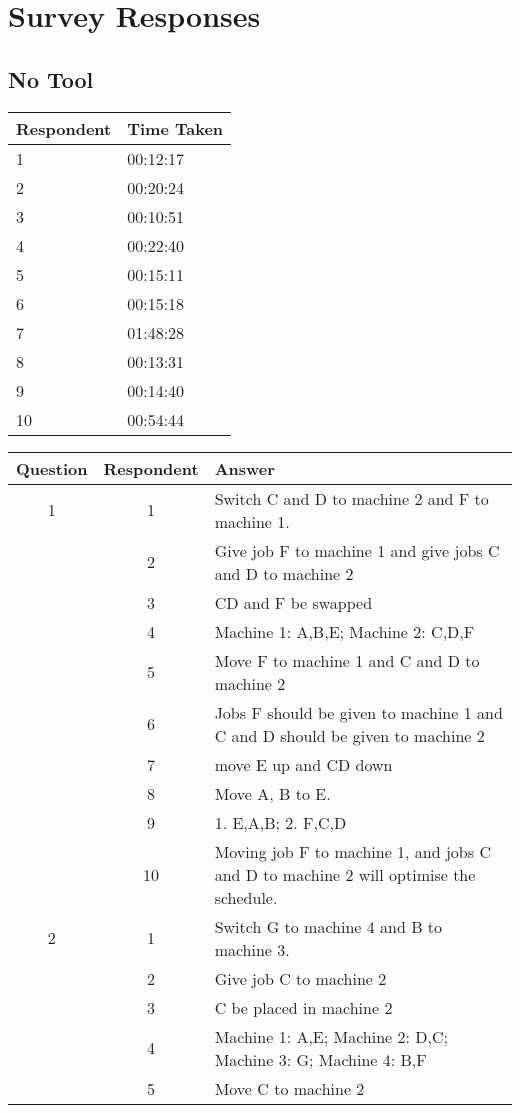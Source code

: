 \chapter{Survey Responses}

\section{No Tool}
\label{notool}

\begin{tabular}{l l}
	Respondent & Time Taken \\
	\hline
	1 & 00:12:17 \\
	2 & 00:20:24 \\
	3 & 00:10:51 \\
	4 & 00:22:40 \\
	5 & 00:15:11 \\
	6 & 00:15:18 \\
	7 & 01:48:28 \\
	8 & 00:13:31 \\
	9 & 00:14:40 \\
	10 & 00:54:44 \\
\end{tabular}
\linespace
\begin{tabularx}{\linewidth}{c c X}
	Question & Respondent & Answer \\
	\hline
	1 & 1 & Switch C and D to machine 2 and F to machine 1. \\
	& 2 & Give job F to machine 1 and give jobs C and D to machine 2 \\
	& 3 & CD and F be swapped \\
	& 4 & Machine 1: A,B,E; Machine 2: C,D,F \\
	& 5 & Move F to machine 1 and C and D to machine 2 \\
	& 6 & Jobs F should be given to machine 1 and C and D should be given to machine 2 \\
	& 7 & move E up and CD down  \\
	& 8 & Move A, B to E. \\
	& 9 & 1. E,A,B; 2. F,C,D \\
	& 10 & Moving job F to machine 1, and jobs C and D to machine 2 will optimise the schedule. \\
	\hline
	2 & 1 & Switch G to machine 4 and B to machine 3. \\
	& 2 & Give job C to machine 2 \\
	& 3 & C be placed in machine 2 \\
	& 4 & Machine 1: A,E; Machine 2: D,C; Machine 3: G; Machine 4: B,F \\
	& 5 & Move C to machine 2 \\
\end{tabularx}
